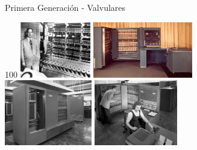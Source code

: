 \documentclass[aspectratio=169]{beamer}
\begin{document}
\begin{frame}[fragile,t]{Primera Generación - Valvulares}
\begin{textblock}{100}
    \includegraphics[height=2.44cm]{img/ias.jpg} \hspace{0.1cm} \includegraphics[height=2.44cm]{img/IBM701.jpg}\\
    \vspace{0.1cm}
    \includegraphics[height=2.86cm]{img/IBM704a.jpg} \hspace{0.1cm} \includegraphics[height=2.86cm]{img/IBM704.jpg}\\
    \end{textblock}
\end{frame}
\end{document}
